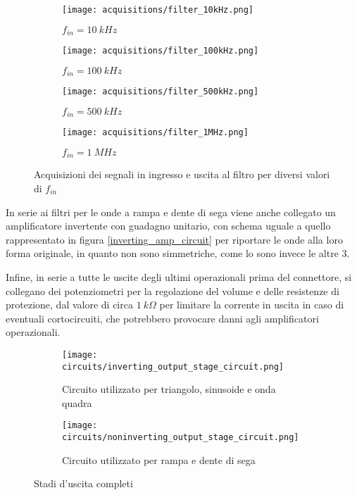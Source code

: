 \begin{figure}[H]
    \centering

    \begin{subfigure}{.5\textwidth}
        \centering
        \texttt{[image: acquisitions/filter\_10kHz.png]}
        \caption{$f_{in}=10\ kHz$}
        \label{acq_filter_10kHz}
    \end{subfigure}%
    \begin{subfigure}{.5\textwidth}
        \centering
        \texttt{[image: acquisitions/filter\_100kHz.png]}
        \caption{$f_{in}=100\ kHz$}
        \label{acq_filter_100kHz}
    \end{subfigure}
    \begin{subfigure}{.5\textwidth}
        \centering
        \texttt{[image: acquisitions/filter\_500kHz.png]}
        \caption{$f_{in}=500\ kHz$}
        \label{acq_filter_500kHz}
    \end{subfigure}%
    \begin{subfigure}{.5\textwidth}
        \centering
        \texttt{[image: acquisitions/filter\_1MHz.png]}
        \caption{$f_{in}=1\ MHz$}
        \label{acq_filter_MHz}
    \end{subfigure}

    \caption{Acquisizioni dei segnali in ingresso e uscita al filtro per diversi valori di $f_{in}$}
    \label{acq_filter}
\end{figure}

In serie ai filtri per le onde a rampa e dente di sega viene anche collegato un amplificatore
invertente con guadagno unitario, con schema uguale a quello rappresentato in figura \ref{inverting_amp_circuit}
per riportare le onde alla loro forma originale, in quanto non sono simmetriche, come lo sono
invece le altre 3.

Infine, in serie a tutte le uscite degli ultimi operazionali prima del connettore, si collegano
dei potenziometri per la regolazione del volume e delle resistenze di protezione, dal valore
di circa $1\ k\Omega$ per limitare la corrente in uscita in caso di eventuali cortocircuiti,
che potrebbero provocare danni agli amplificatori operazionali.

\begin{figure}[H]
    \centering

    \begin{subfigure}{\textwidth}
        \centering
        \texttt{[image: circuits/inverting\_output\_stage\_circuit.png]}
        \caption{Circuito utilizzato per triangolo, sinusoide e onda quadra}
        \label{inverting_output_stage_circuit}
    \end{subfigure}
    \begin{subfigure}{\textwidth}
        \centering
        \texttt{[image: circuits/noninverting\_output\_stage\_circuit.png]}
        \caption{Circuito utilizzato per rampa e dente di sega}
        \label{noninverting_output_stage_circuit}
    \end{subfigure}

    \caption{Stadi d'uscita completi}
    \label{output_stages}
\end{figure}

